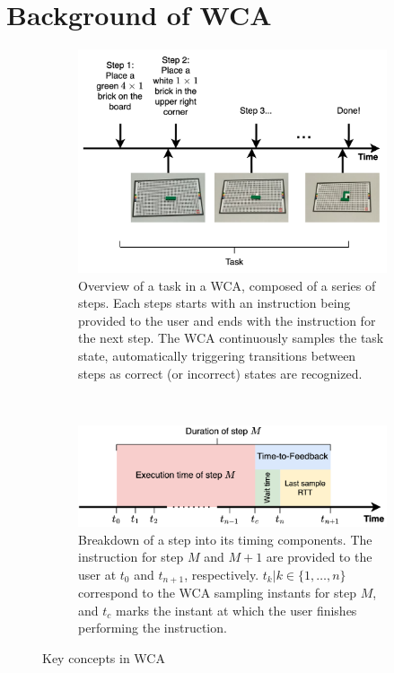 \section{Background of \gls{WCA}}\label{sec:background}

\begin{figure}
    \centering
    \begin{subfigure}{\textwidth}
        \centering
        \includegraphics[width=.9\textwidth]{figs/task}
        \caption{%
            Overview of a task in a \gls{WCA}, composed of a series of steps.
            Each steps starts with an instruction being provided to the user and ends with the instruction for the next step.
            The \gls{WCA} continuously samples the task state, automatically triggering transitions between steps as correct (or incorrect) states are recognized.
        }\label{fig:task}
    \end{subfigure}\\
    \begin{subfigure}{\textwidth}
        \centering
        \includegraphics[width=.9\textwidth]{figs/step_time}
        \caption{%
            Breakdown of a step into its timing components.
            The instruction for step \( M \) and \( M + 1 \) are provided to the user at \( t_0 \) and \( t_{n+1} \), respectively.
            \( t_k | k \in \{1, \ldots, n \} \) correspond to the \gls{WCA} sampling instants for step \( M \), and \( t_c \) marks the instant at which the user finishes performing the instruction.
        }\label{fig:step}
    \end{subfigure}
    \caption{Key concepts in \gls{WCA}}
\end{figure}

